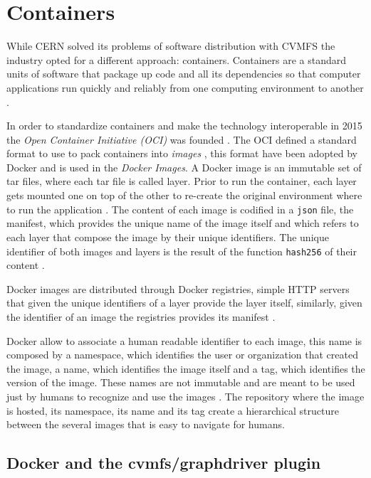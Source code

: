 \section{Containers}
\label{sec:containers}

While CERN solved its problems of software distribution with CVMFS the industry
opted for a different approach: containers. 
Containers are a standard units of software that package up code and all its
dependencies so that computer applications run quickly and reliably from one
computing environment to another \cite{docker:what}.

In order to standardize containers and make the technology interoperable in
2015 the \textit{Open Container Initiative (OCI)} was founded \cite{oci}. The
OCI defined a standard format to use to pack containers into \textit{images}
\cite{oci:image-spec}, this format have been adopted by Docker and is used in
the \textit{Docker Images}.  A Docker image is an immutable set of tar files,
where each tar file is called layer. Prior to run the container, each layer
gets mounted one on top of the other to re-create the original environment
where to run the application \cite{oci:image-filesystem}. The content of each
image is codified in a \texttt{json} file, the manifest, which provides the
unique name of the image itself and which refers to each layer that compose the
image by their unique identifiers. The unique identifier of both images and
layers is the result of the function \texttt{hash256} of their content
\cite{oci:content}. 

Docker images are distributed through Docker registries, simple HTTP servers
that given the unique identifiers of a layer provide the layer itself,
similarly, given the identifier of an image the registries provides its
manifest \cite{docker:registry}.

Docker allow to associate a human readable identifier to each image, this name
is composed by a namespace, which identifies the user or organization that created
the image, a name, which identifies the image itself and a tag, which identifies
the version of the image. These names are not immutable and are meant to be
used just by humans to recognize and use the images \cite{docker:tag}.
The repository where the image is hosted, its namespace, its name and its tag
create a hierarchical structure between the several images that is easy to
navigate for humans.

\subsection{Docker and the cvmfs/graphdriver plugin}
\label{subsec:docker-thin-images}

